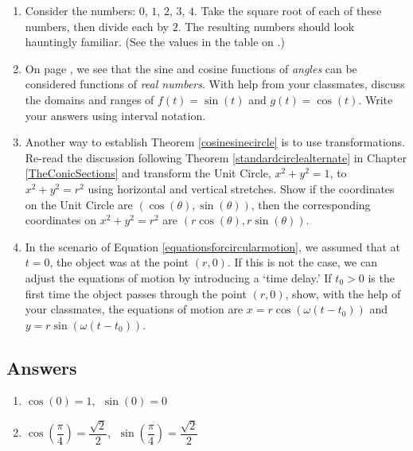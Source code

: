 \documentclass{ximera}
\begin{document}
\begin{enumerate}

\setcounter{enumi}{\value{HW}}

\item Consider the numbers:  $0$, $1$, $2$, $3$, $4$.  Take the square root of each of these numbers, then divide each by $2$. The resulting numbers should look hauntingly familiar. (See the values in the table on \pageref{CosineSineFacts}.) 


\item  On page \pageref{cosinesineequationsrealnumbers}, we see that the sine and cosine functions of \textit{angles} can be considered functions of \textit{real numbers}.  With help from your classmates, discuss the domains and ranges of  $f(t) = \sin(t)$ and $g(t) = \cos(t)$.  Write your answers using interval notation.


\item  \label{circleofradiusrsinecosinetrans}  Another way to establish  Theorem \ref{cosinesinecircle} is to use transformations. Re-read the discussion following  Theorem \ref{standardcirclealternate} in Chapter \ref{TheConicSections}  and transform  the Unit Circle, $x^2+y^2 = 1$, to $x^2 + y^2 = r^2$ using horizontal and vertical stretches.  Show if the coordinates on the Unit Circle are $(\cos(\theta), \sin(\theta))$, then the corresponding coordinates on $x^2+y^2 = r^2$ are $(r \cos(\theta), r \sin(\theta))$.

\item  In the scenario of Equation \ref{equationsforcircularmotion}, we assumed that at $t=0$, the object was at the point $(r,0)$.  If this is not the case,  we can adjust the equations of motion by introducing a `time delay.'   If $t_{0} > 0$ is the first time the object passes through the point $(r,0)$, show, with the help of your classmates, the equations of motion are $x = r \cos(\omega (t - t_{0}))$ and $y = r \sin(\omega (t-t_{0}))$.


\end{enumerate}

\newpage

\subsection{Answers}

\begin{multicols}{2}

\begin{enumerate}

\item $\cos(0) = 1$, $\; \sin(0) = 0$ 

\item $\cos \left(\dfrac{\pi}{4} \right) = \dfrac{\sqrt{2}}{2}$, $\; \sin \left(\dfrac{\pi}{4} \right) = \dfrac{\sqrt{2}}{2}$

\setcounter{HW}{\value{enumi}}

\end{enumerate}

\end{multicols}
\end{document}
